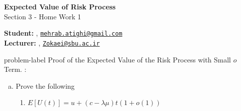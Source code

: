 	






		\begin{Large}
		\textsf{\textbf{Expected Value of Risk Process}}\\
		Section 3 - Home Work 1
	\end{Large}
	
	\vspace{1ex}
	
	\textsf{\textbf{Student:}} , \href{mailto:mehrab.atighi@gmail.com}{\texttt{mehrab.atighi@gmail.com}}\\
	\textsf{\textbf{Lecturer:}} , \href{mailto:Zokaei@sbu.ac.ir}{\texttt{Zokaei@sbu.ac.ir}}
	
	
	\vspace{2ex}
	
	\begin{problem}{}{problem-label}
		Proof of the Expected Value of the Risk Process with Small \( o \) Term. \cite{Embrechts.etal1997}:

		\begin{enumerate}[(a)]
			\item Prove the following
			\begin{enumerate}[label = (\roman*)]
				\item $E[U(t)] = u + (c - \lambda \mu)t (1 + o(1))$
			\end{enumerate}
		\end{enumerate}
	\end{problem}
	
